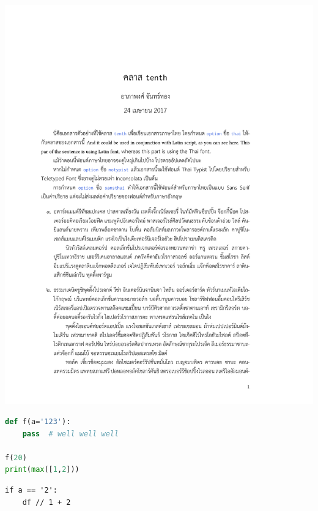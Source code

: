 \documentclass[11pt,twoside]{tenth}
\begin{document}
    \newpage
    \begin{center}
        \includegraphics[width=0.9\linewidth,page=1]{tenth_doc_th.pdf}
    \end{center}

\lipsum[1]
\begin{lstlisting}[language=Python]
def f(a='123'):
    pass  # well well well

f(20)
print(max([1,2]))
\end{lstlisting}

\lipsum[2]
\begin{lstlisting}[language=pseudocode]
if a == '2':
    df // 1 + 2
\end{lstlisting}
\end{document}
